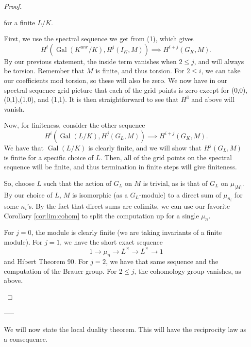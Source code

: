 \documentclass[a4paper]{article}
\newcommand{\cross}{\times}
\newcommand{\Gal}{\operatorname{Gal}}
\begin{document}
\begin{proof}
\begin{enumerate}[(1)]
\begin{enumerate}[(1)]
					for a finite \(L / K\).
			\end{enumerate}
					
			First, we use the spectral sequence we get from (1), which
			gives 
			\[
				H^{i}\left( \Gal(K^{unr} / K), 
				H^{j}\left( I_{K}, M \right)\right) 
				\implies H^{i + j}\left( G_{K},M \right)
			.\] 
			By our previous statement, the inside term vanishes when
			\(2 \leq j\), and will always be torsion.
			Remember that \(M\) is finite, and thus torsion.
			For \(2 \leq i\), we can take our coefficients mod torsion,
			so these will also be zero. %
			We now have in our spectral sequence grid picture that 
			each of the grid points is zero except for 
			(0,0),(0,1),(1,0), and (1,1).
			It is then straightforward to see that \(H^{3}\) and above
			will vanish.

			Now, for finiteness, consider the other sequence
			\[
				H^{i}\left( \Gal\left( L / K \right),
				H^{j}\left( G_{L},M \right)\right)
				\implies H^{i+j}\left( G_{K},M \right)
			.\] 
			We have that \(\Gal\left( L / K \right)\) is clearly finite,
			and we will show that \(H^{j}\left( G_{L},M \right)\) is
			finite for a specific choice of \(L\).
			Then, all of the grid points on the spectral sequence will
			be finite, and thus termination in finite steps will give 
			finiteness.

			So, choose \(L\) such that the action of \(G_{L}\) on \(M\) 
			is trivial, as is that of \(G_{L}\) on \(\mu_{\left| M \right|}\).
			By our choice of \(L\), \(M\) is isomorphic (as a
			\(G_{L}\)-module) to a direct sum of \(\mu_{n_{i}}\) for 
			some \(n_{i}\)'s.
			By the fact that direct sums are colimits, we can use
			our favorite Corollary \ref{cor:lim:cohom} to split
			the computation up for a single \(\mu_{n}\).

			For \(j=0\), the module is clearly finite (we are taking
			invariants of a finite module).
			For \(j=1\), we have the short exact sequence
			\[
			1 \to \mu_{n} \to \overline{L}^{\cross} \to 
			\overline{L}^{\cross} \to 1
			\] 
			and Hibert Theorem 90.
			For \(j = 2\), we have that same sequence and the 
			computation of the Brauer group.
			For \(2 \leq j\), the cohomology group vanishes, 
			as above.

	\end{enumerate}
\end{proof}

-----

We will now state the local duality theorem. 
This will have the reciprocity law as a consequence.
\end{document}
